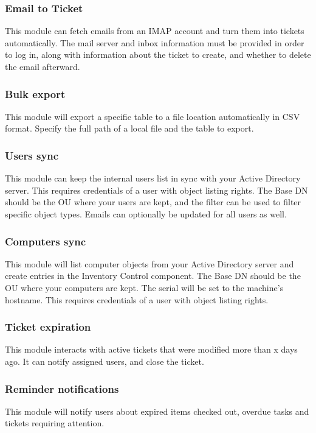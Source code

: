 \documentclass[11pt]{article}
\begin{document}
\subsubsection{Email to Ticket}
This module can fetch emails from an IMAP account and turn them into tickets automatically. The mail server and inbox information must be provided in order to log in, along with information about the ticket to create, and whether to delete the email afterward.

\subsubsection{Bulk export}
This module will export a specific table to a file location automatically in CSV format. Specify the full path of a local file and the table to export.

\subsubsection{Users sync}
This module can keep the internal users list in sync with your Active Directory server. This requires credentials of a user with object listing rights. The Base DN should be the OU where your users are kept, and the filter can be used to filter specific object types. Emails can optionally be updated for all users as well.

\subsubsection{Computers sync}
This module will list computer objects from your Active Directory server and create entries in the Inventory Control component. The Base DN should be the OU where your computers are kept. The serial will be set to the machine's hostname. This requires credentials of a user with object listing rights.

\subsubsection{Ticket expiration}
This module interacts with active tickets that were modified more than x days ago. It can notify assigned users, and close the ticket.

\subsubsection{Reminder notifications}
This module will notify users about expired items checked out, overdue tasks and tickets requiring attention.
\end{document}
